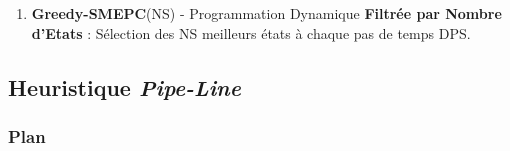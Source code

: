 \documentclass[hyperref={bookmarks=false},aspectratio=169]{beamer}
\begin{document}
\begin{frame}
\begin{enumerate}
\pause
\item \textbf{ Greedy-SMEPC}(NS) - Programmation Dynamique \textbf{Filtrée par Nombre d’Etats} : Sélection des NS meilleurs états à chaque pas de temps DPS.
\end{enumerate}
\end{frame}



\subsection{Heuristique \textbf{\textit{Pipe-Line}}}
\begin{frame}
\frametitle{Plan}
\addtocounter{framenumber}{-1}
\end{frame}
\end{document}
